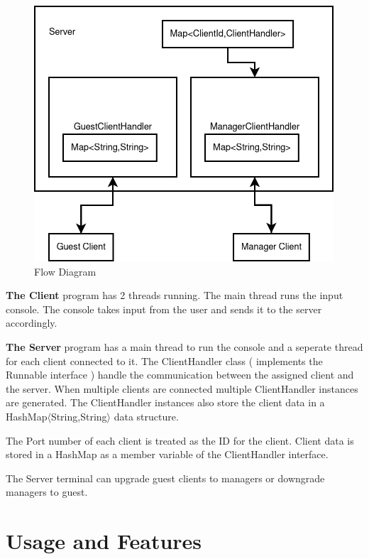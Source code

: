 \documentclass[titlepage]{article}
\begin{document}
    \begin{figure}[!ht]
        \centering
        \includegraphics[scale=0.6]{./serverClient.png}
        \caption{Flow Diagram}
    \end{figure}

    \textbf{The Client} program has 2 threads running. The main thread runs the input console.
    The console takes input from the user and sends it to the server accordingly.

    \textbf{The Server} program has a main thread to run the console and a seperate thread for
    each client connected to it. The ClientHandler class ( implements the Runnable interface )
    handle the communication between the assigned client and the server. When multiple clients are
    connected multiple ClientHandler instances are generated. The ClientHandler instances also
    store the client data in a HashMap$\langle$String,String$\rangle$ data structure.

    The Port number of each client is treated as the ID for the client.
    Client data is stored in a HashMap as a member variable of the ClientHandler interface.

    The Server terminal can upgrade guest clients to managers or downgrade managers to guest.

    \pagebreak
    \section{Usage and Features}
\end{document}
